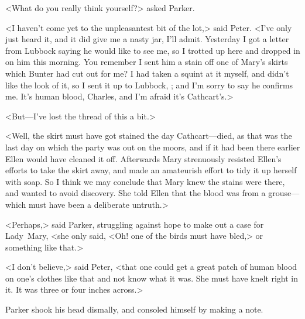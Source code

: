 <What do you really think yourself?> asked Parker.

<I haven't come yet to the unpleasantest bit of the lot,> said Peter. <I've only just heard it, and it did give me a nasty jar, I'll admit.  Yesterday I got a letter from Lubbock saying he would like to see me, so I trotted up here and dropped in on him this morning. You remember I sent him a stain off one of Mary's skirts which Bunter had cut out for me? I had taken a squint at it myself, and didn't like the look of it, so I sent it up to Lubbock, ; and I'm sorry to say he confirms me. It's human blood, Charles, and I'm afraid it's Cathcart's.>

<But—I've lost the thread of this a bit.>

<Well, the skirt must have got stained the day Cathcart—died, as that was the last day on which the party was out on the moors, and if it had been there earlier Ellen would have cleaned it off. Afterwards Mary strenuously resisted Ellen's efforts to take the skirt away, and made an amateurish effort to tidy it up herself with soap. So I think we may conclude that Mary knew the stains were there, and wanted to avoid discovery. She told Ellen that the blood was from a grouse—which must have been a deliberate untruth.>

<Perhaps,> said Parker, struggling against hope to make out a case for Lady~Mary, <she only said, <Oh! one of the birds must have bled,> or something like that.>

<I don't believe,> said Peter, <that one could get a great patch of human blood on one's clothes like that and not know what it was. She must have knelt right in it. It was three or four inches across.>

Parker shook his head dismally, and consoled himself by making a note.

